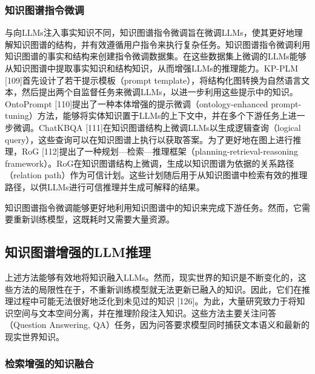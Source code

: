 \documentclass[11pt,UTF8,fontset=fandol]{ctexart}
\begin{document}
\subsubsection{知识图谱指令微调}

与向LLMs注入事实知识不同，知识图谱指令微调旨在微调LLMs，使其更好地理解知识图谱的结构，并有效遵循用户指令来执行复杂任务。知识图谱指令微调利用知识图谱的事实和结构来创建指令微调数据集。在这些数据集上微调的LLMs能够从知识图谱中提取事实知识和结构知识，从而增强LLMs的推理能力。KP-PLM [109]首先设计了若干提示模板（prompt template），将结构化图转换为自然语言文本，然后提出两个自监督任务来微调LLMs，以进一步利用这些提示中的知识。OntoPrompt [110]提出了一种本体增强的提示微调（ontology-enhanced prompt-tuning）方法，能够将实体知识置于LLMs的上下文中，并在多个下游任务上进一步微调。ChatKBQA [111]在知识图谱结构上微调LLMs以生成逻辑查询（logical query），这些查询可以在知识图谱上执行以获取答案。为了更好地在图上进行推理，RoG [112]提出了一种规划—检索—推理框架（planning-retrieval-reasoning framework）。RoG在知识图谱结构上微调，生成以知识图谱为依据的关系路径（relation path）作为可信计划。这些计划随后用于从知识图谱中检索有效的推理路径，以供LLMs进行可信推理并生成可解释的结果。

知识图谱指令微调能够更好地利用知识图谱中的知识来完成下游任务。然而，它需要重新训练模型，这既耗时又需要大量资源。

\subsection{知识图谱增强的LLM推理}

上述方法能够有效地将知识融入LLMs。然而，现实世界的知识是不断变化的，这些方法的局限性在于，不重新训练模型就无法更新已融入的知识。因此，它们在推理过程中可能无法很好地泛化到未见过的知识 [126]。为此，大量研究致力于将知识空间与文本空间分离，并在推理阶段注入知识。这些方法主要关注问答（Question Answering, QA）任务，因为问答要求模型同时捕获文本语义和最新的现实世界知识。

\subsubsection{检索增强的知识融合}
\end{document}
